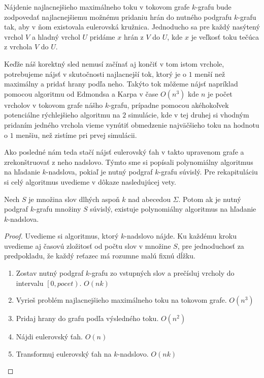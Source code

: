 Nájdenie najlacnejšieho maximálneho toku v tokovom grafe $k$-grafu bude zodpovedať
najlacnejšiemu možnému pridaniu hrán do nutného podgrafu $k$-grafu tak, aby v ňom existovala eulerovská
kružnica. Jednoducho sa pre každý nasýtený vrchol $V$ a hladný vrchol $U$ pridáme $x$ hrán z $V$ do $U$,
kde $x$ je veľkosť toku tečúca z vrchola $V$ do $U$.

Keďže náš korektný sled nemusí začínať aj končiť v tom istom vrchole, potrebujeme
nájsť v skutočnosti najlacnejší tok, ktorý je o $1$ menší než maximálny a pridať hrany podľa neho.
Takýto tok môžeme nájsť napríklad pomocou algoritmu od Edmondsa a Karpa \cite{mincost_maxflow} v
čase $O(n^3)$ kde $n$ je počet vrcholov v tokovom grafe nášho $k$-grafu, prípadne pomocou akéhokoľvek potenciálne rýchlejšieho
algoritmu na $2$ simulácie, kde v tej druhej si vhodným pridaním jedného vrchola vieme vynútiť
obmedzenie najväčšieho toku na hodnotu o $1$ menšiu, než zistíme pri prvej simulácii.

Ako posledné nám teda stačí nájsť eulerovský ťah v takto upravenom grafe a zrekonštruovať z neho
nadslovo. Týmto sme si popísali polynomiálny algoritmus na hľadanie $k$-nadslova, pokiaľ je
nutný podgraf $k$-grafu súvislý. Pre rekapituláciu si celý algoritmus uvedieme v dôkaze nasledujúcej
vety.

\begin{veta}
    Nech $S$ je množina slov dlhých aspoň $k$ nad abecedou $\Sigma$. Potom ak je nutný podgraf $k$-grafu množiny $S$
    súvislý, existuje polynomiálny algoritmus na hľadanie $k$-nadslova.
\end{veta}

\begin{proof}
    Uvedieme si algoritmus, ktorý $k$-nadslovo nájde. Ku každému kroku uvedieme aj časovú zložitosť od počtu slov v
    množine $S$, pre jednoduchosť za predpokladu, že každý reťazec má rozumne malú fixnú dĺžku.
    \begin{enumerate}
        \item Zostav nutný podgraf $k$-grafu zo vstupných slov a prečísluj vrcholy do intervalu $\left[0, pocet\right)$. $O(nk)$
        \item Vyrieš problém najlacnejšieho maximálneho toku na tokovom grafe. $O(n^3)$
        \item Pridaj hrany do grafu podľa výsledného toku. $O(n^2)$
        \item Nájdi eulerovský ťah. $O(n)$
        \item Transformuj eulerovský ťah na $k$-nadslovo. $O(nk)$ \qedhere
    \end{enumerate}
\end{proof}

